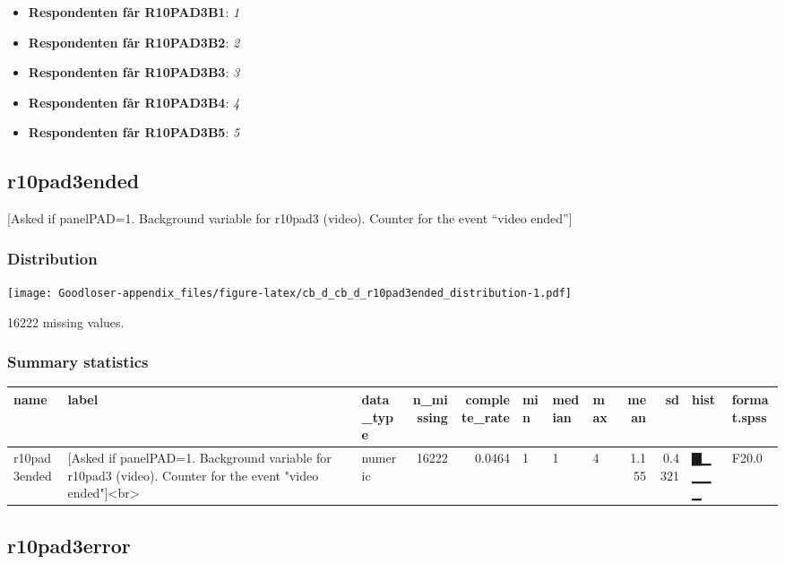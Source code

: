 \documentclass[
]{book}
\providecommand{\tightlist}{%
  \setlength{\itemsep}{0pt}\setlength{\parskip}{0pt}}
\begin{document}
\begin{itemize}
\tightlist
\item
  \textbf{Respondenten får R10PAD3B1}: \emph{1}
\item
  \textbf{Respondenten får R10PAD3B2}: \emph{2}
\item
  \textbf{Respondenten får R10PAD3B3}: \emph{3}
\item
  \textbf{Respondenten får R10PAD3B4}: \emph{4}
\item
  \textbf{Respondenten får R10PAD3B5}: \emph{5}
\end{itemize}

\hypertarget{r10pad3ended}{%
\subsection{r10pad3ended}\label{r10pad3ended}}

{[}Asked if panelPAD=1. Background variable for r10pad3 (video). Counter for the event ``video ended''{]}

\hypertarget{r10pad3ended_distribution}{%
\subsubsection{Distribution}\label{r10pad3ended_distribution}}

\texttt{[image: Goodloser-appendix\_files/figure-latex/cb\_d\_cb\_d\_r10pad3ended\_distribution-1.pdf]}

16222 missing values.

\hypertarget{r10pad3ended_summary}{%
\subsubsection{Summary statistics}\label{r10pad3ended_summary}}

\begin{tabular}{l|l|l|r|r|l|l|l|r|r|l|l}
\hline
name & label & data_type & n_missing & complete_rate & min & median & max & mean & sd & hist & format.spss\\
\hline
r10pad3ended & [Asked if panelPAD=1. Background variable for r10pad3 (video). Counter for the event "video ended"]<br> & numeric & 16222 & 0.0464 & 1 & 1 & 4 & 1.155 & 0.4321 & ▇▁▁▁▁ & F20.0\\
\hline
\end{tabular}

\hypertarget{r10pad3error}{%
\subsection{r10pad3error}\label{r10pad3error}}
\end{document}
